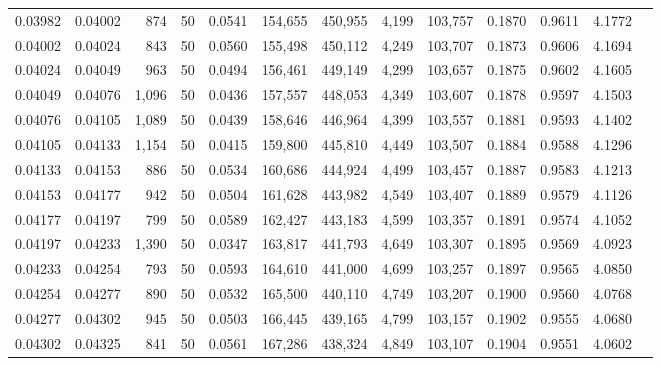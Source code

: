 \begin{tabular}{rrrrrrrrrrrrr}
0.03982 & 0.04002 &   874 &  50 &                                     0.0541 & 154,655 & 450,955 &   4,199 & 103,757 & 0.1870 & 0.9611 & 4.1772 \\
0.04002 & 0.04024 &   843 &  50 &                                     0.0560 & 155,498 & 450,112 &   4,249 & 103,707 & 0.1873 & 0.9606 & 4.1694 \\
0.04024 & 0.04049 &   963 &  50 &                                     0.0494 & 156,461 & 449,149 &   4,299 & 103,657 & 0.1875 & 0.9602 & 4.1605 \\
0.04049 & 0.04076 & 1,096 &  50 &                                     0.0436 & 157,557 & 448,053 &   4,349 & 103,607 & 0.1878 & 0.9597 & 4.1503 \\
0.04076 & 0.04105 & 1,089 &  50 &                                     0.0439 & 158,646 & 446,964 &   4,399 & 103,557 & 0.1881 & 0.9593 & 4.1402 \\
0.04105 & 0.04133 & 1,154 &  50 &                                     0.0415 & 159,800 & 445,810 &   4,449 & 103,507 & 0.1884 & 0.9588 & 4.1296 \\
0.04133 & 0.04153 &   886 &  50 &                                     0.0534 & 160,686 & 444,924 &   4,499 & 103,457 & 0.1887 & 0.9583 & 4.1213 \\
0.04153 & 0.04177 &   942 &  50 &                                     0.0504 & 161,628 & 443,982 &   4,549 & 103,407 & 0.1889 & 0.9579 & 4.1126 \\
0.04177 & 0.04197 &   799 &  50 &                                     0.0589 & 162,427 & 443,183 &   4,599 & 103,357 & 0.1891 & 0.9574 & 4.1052 \\
0.04197 & 0.04233 & 1,390 &  50 &                                     0.0347 & 163,817 & 441,793 &   4,649 & 103,307 & 0.1895 & 0.9569 & 4.0923 \\
0.04233 & 0.04254 &   793 &  50 &                                     0.0593 & 164,610 & 441,000 &   4,699 & 103,257 & 0.1897 & 0.9565 & 4.0850 \\
0.04254 & 0.04277 &   890 &  50 &                                     0.0532 & 165,500 & 440,110 &   4,749 & 103,207 & 0.1900 & 0.9560 & 4.0768 \\
0.04277 & 0.04302 &   945 &  50 &                                     0.0503 & 166,445 & 439,165 &   4,799 & 103,157 & 0.1902 & 0.9555 & 4.0680 \\
0.04302 & 0.04325 &   841 &  50 &                                     0.0561 & 167,286 & 438,324 &   4,849 & 103,107 & 0.1904 & 0.9551 & 4.0602 \\

\end{tabular}
